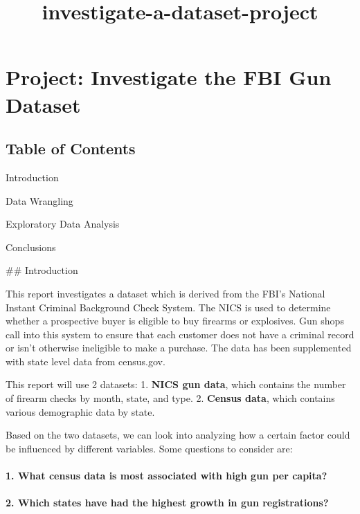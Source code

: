 \documentclass[11pt]{article}
\title{investigate-a-dataset-project}
\begin{document}
    
    
    \maketitle
    
    

    
    \section{Project: Investigate the FBI Gun
Dataset}\label{project-investigate-the-fbi-gun-dataset}

\subsection{Table of Contents}\label{table-of-contents}

Introduction

Data Wrangling

Exploratory Data Analysis

Conclusions

     \#\# Introduction

This report investigates a dataset which is derived from the FBI's
National Instant Criminal Background Check System. The NICS is used to
determine whether a prospective buyer is eligible to buy firearms or
explosives. Gun shops call into this system to ensure that each customer
does not have a criminal record or isn't otherwise ineligible to make a
purchase. The data has been supplemented with state level data from
census.gov.

This report will use 2 datasets: 1. \textbf{NICS gun data}, which
contains the number of firearm checks by month, state, and type. 2.
\textbf{Census data}, which contains various demographic data by state.

Based on the two datasets, we can look into analyzing how a certain
factor could be influenced by different variables. Some questions to
consider are:

\paragraph{1. What census data is most associated with high gun per
capita?}\label{what-census-data-is-most-associated-with-high-gun-per-capita}

\paragraph{2. Which states have had the highest growth in gun
registrations?}\label{which-states-have-had-the-highest-growth-in-gun-registrations}
\end{document}
